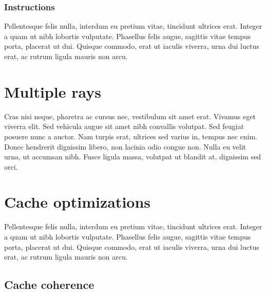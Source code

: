 \subsubsection{Instructions}
Pellentesque felis nulla, interdum eu pretium vitae, tincidunt ultrices erat. Integer a quam ut nibh lobortis vulputate. Phasellus felis augue, sagittis vitae tempus porta, placerat ut dui. Quisque commodo, erat ut iaculis viverra, urna dui luctus erat, ac rutrum ligula mauris non arcu.
\section{Multiple rays}
Cras nisi neque, pharetra ac cursus nec, vestibulum sit amet erat. Vivamus eget viverra elit. Sed vehicula augue sit amet nibh convallis volutpat. Sed feugiat posuere nunc a auctor. Nam turpis erat, ultrices sed varius in, tempus nec enim. Donec hendrerit dignissim libero, non lacinia odio congue non. Nulla eu velit urna, ut accumsan nibh. Fusce ligula massa, volutpat ut blandit at, dignissim sed orci. 
\section{Cache optimizations}
Pellentesque felis nulla, interdum eu pretium vitae, tincidunt ultrices erat. Integer a quam ut nibh lobortis vulputate. Phasellus felis augue, sagittis vitae tempus porta, placerat ut dui. Quisque commodo, erat ut iaculis viverra, urna dui luctus erat, ac rutrum ligula mauris non arcu.
\subsection{Cache coherence}